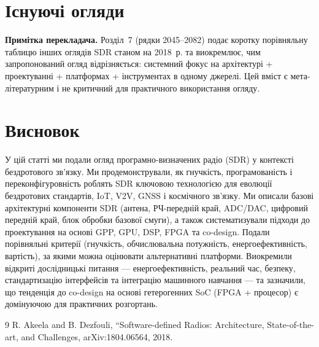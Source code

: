 \documentclass[journal]{IEEEtran}
\begin{document}
\section{Існуючі огляди}
\label{old}

\textbf{Примітка перекладача.} Розділ~7 (рядки 2045--2082) подає коротку порівняльну таблицю інших оглядів SDR станом на 2018~р. та виокремлює, чим запропонований огляд відрізняється: системний фокус на архітектурі + проектуванні + платформах + інструментах в одному джерелі. Цей вміст є мета-літературним і не критичний для практичного використання огляду.


\section{Висновок}
\label{conc}

У цій статті ми подали огляд програмно-визначених радіо (SDR) у контексті бездротового зв'язку. Ми продемонстрували, як гнучкість, програмованість і переконфігуровність роблять SDR ключовою технологією для еволюції бездротових стандартів, IoT, V2V, GNSS і космічного зв'язку.
Ми описали базові архітектурні компоненти SDR (антена, РЧ-передній край, ADC/DAC, цифровий передній край, блок обробки базової смуги), а також систематизували підходи до проектування на основі GPP, GPU, DSP, FPGA та co-design.
Подали порівняльні критерії (гнучкість, обчислювальна потужність, енергоефективність, вартість), за якими можна оцінювати альтернативні платформи.
Виокремили відкриті дослідницькі питання — енергоефективність, реальний час, безпеку, стандартизацію інтерфейсів та інтеграцію машинного навчання — та зазначили, що тенденція до co-design на основі гетерогенних SoC (FPGA + процесор) є домінуючою для практичних розгортань.


\begin{thebibliography}{9}
 R. Akeela and B. Dezfouli, ``Software-defined Radios: Architecture, State-of-the-art, and Challenges, arXiv:1804.06564, 2018.
\end{thebibliography}
\end{document}
